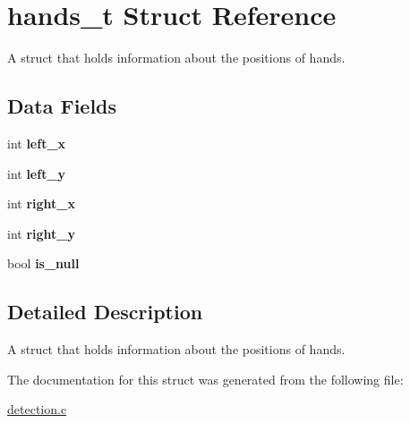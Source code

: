 \hypertarget{structhands__t}{}\section{hands\+\_\+t Struct Reference}
\label{structhands__t}


A struct that holds information about the positions of hands.  


\subsection*{Data Fields}
\begin{DoxyCompactItemize}
\item 
int {\bfseries left\+\_\+x}\hypertarget{structhands__t_a3e1c818b54edbd29b98ff70ed074cb52}{}\label{structhands__t_a3e1c818b54edbd29b98ff70ed074cb52}

\item 
int {\bfseries left\+\_\+y}\hypertarget{structhands__t_af2d414418244f251bf5a71696dff5dd1}{}\label{structhands__t_af2d414418244f251bf5a71696dff5dd1}

\item 
int {\bfseries right\+\_\+x}\hypertarget{structhands__t_a48a708fc79311fbe7bbf4a7c7d02c2a1}{}\label{structhands__t_a48a708fc79311fbe7bbf4a7c7d02c2a1}

\item 
int {\bfseries right\+\_\+y}\hypertarget{structhands__t_ac06334a23af757b43cce75e28647c05a}{}\label{structhands__t_ac06334a23af757b43cce75e28647c05a}

\item 
bool {\bfseries is\+\_\+null}\hypertarget{structhands__t_a899e2afed86d28479aa030b63a5e1193}{}\label{structhands__t_a899e2afed86d28479aa030b63a5e1193}

\end{DoxyCompactItemize}


\subsection{Detailed Description}
A struct that holds information about the positions of hands. 

The documentation for this struct was generated from the following file\+:\begin{DoxyCompactItemize}
\item 
\hyperlink{detection_8c}{detection.\+c}\end{DoxyCompactItemize}
